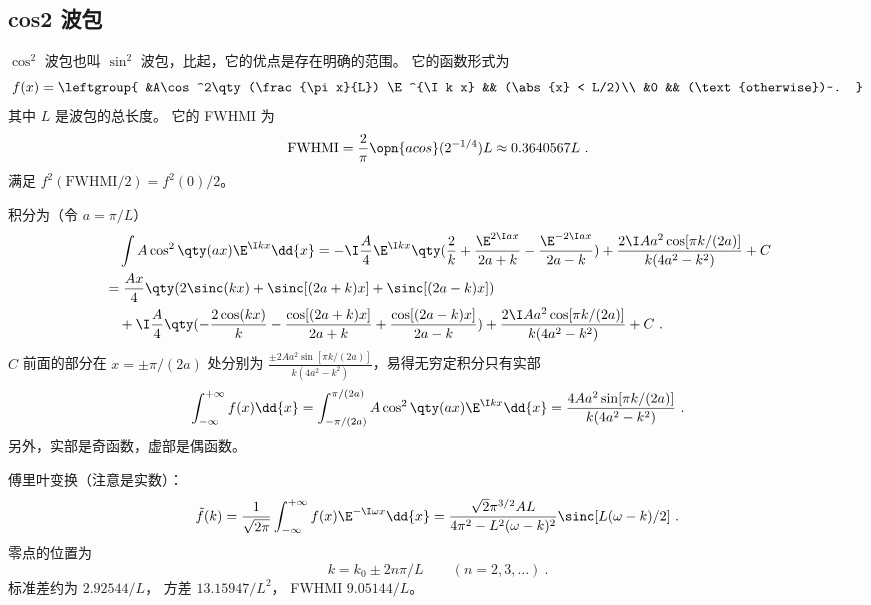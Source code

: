 
\subsection{cos2 波包}
$\cos^2$ 波包也叫 $\sin^2$ 波包，比起，它的优点是存在明确的范围。 它的函数形式为
\begin{equation}\label{eq_cos2wp_5}
f(x) = \leftgroup{
&A\cos^2\qty(\frac{\pi x}{L}) \E^{\I k x} && (\abs{x} < L/2)\\
&0 && (\text{otherwise})~.
}\end{equation}
其中 $L$ 是波包的总长度。 它的 FWHMI 为
\begin{equation}\label{eq_cos2wp_4} %
\text{FWHMI} = \frac{2}{\pi}\opn{acos}(2^{-1/4}) L \approx 0.3640567 L~.
\end{equation}
满足 $f^2(\text{FWHMI/2}) = f^2(0)/2$。

积分为（令 $a = \pi/L$）
\begin{equation}\label{eq_cos2wp_2} %
\begin{aligned}
&\quad \int A\cos^2\qty(a x) \E^{\I kx} \dd{x} = -\I\frac{A}{4}\E^{\I kx}\qty(\frac{2}{k} +\frac{\E^{2\I ax}}{2a+k} -\frac{\E^{-2\I ax}}{2a-k}) + \frac{2\I Aa^2\cos[{\pi k}/{(2a)}]}{k(4 a^2 -k^2)} + C\\
&= \frac{Ax}{4} \qty(2\sinc(k x) + \sinc[(2 a+k)x] + \sinc[(2 a-k)x])\\
&\quad + \I\frac{A}{4} \qty(-\frac{2\cos(k x)}{k} -\frac{\cos[(2 a+k)x]}{2 a+k} +\frac{\cos[(2 a-k)x]}{2 a-k}) + \frac{2\I Aa^2\cos[{\pi k}/{(2a)}]}{k(4 a^2 -k^2)} + C~.
\end{aligned}
\end{equation}
$C$ 前面的部分在 $x = \pm\pi/(2a)$ 处分别为 $\frac{\pm 2 Aa^2\sin[{\pi k}/{(2a)}]}{k(4 a^2 -k^2)}$，易得无穷定积分只有实部
\begin{equation}%
\int_{-\infty}^{+\infty} f(x) \dd{x} = \int_{-\pi/(2a)}^{\pi/(2a)} A\cos^2\qty(a x)\E^{\I k x} \dd{x} = \frac{4 Aa^2\sin[{\pi k}/{(2a)}]}{k(4 a^2 -k^2)}~.
\end{equation}
另外，实部是奇函数，虚部是偶函数。

傅里叶变换（注意是实数）：
\begin{equation} %
\tilde f(k) = \frac{1}{\sqrt{2\pi}} \int_{-\infty}^{+\infty} f(x) \E^{-\I \omega x} \dd{x}
= \frac{\sqrt{2} \pi ^{3/2} A L}{4 \pi ^2-L^2 (\omega-k)^2} \sinc[L(\omega-k)/2]~.
\end{equation}
零点的位置为
\begin{equation} %
k = k_0 \pm 2n\pi/L \qquad (n=2,3,\dots)~.
\end{equation}
标准差约为 $2.92544/L$， 方差 $13.15947/L^2$， FWHMI $9.05144/L$。

